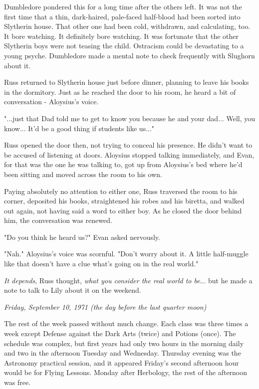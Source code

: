 \documentclass[a4paper,11pt]{article}
\begin{document}
Dumbledore pondered this for a long time after the others left. It was not the first time that a thin, dark-haired, pale-faced half-blood had been sorted into Slytherin house. That other one had been cold, withdrawn, and calculating, too. It bore watching. It definitely bore watching. It was fortunate that the other Slytherin boys were not teasing the child. Ostracism could be devastating to a young psyche. Dumbledore made a mental note to check frequently with Slughorn about it.

Russ returned to Slytherin house just before dinner, planning to leave his books in the dormitory. Just as he reached the door to his room, he heard a bit of conversation - Aloysius's voice.

"...just that Dad told me to get to know you because he and your dad... Well, you know... It'd be a good thing if students like us..."

Russ opened the door then, not trying to conceal his presence. He didn't want to be accused of listening at doors. Aloysius stopped talking immediately, and Evan, for that was the one he was talking to, got up from Aloysius's bed where he'd been sitting and moved across the room to his own.

Paying absolutely no attention to either one, Russ traversed the room to his corner, deposited his books, straightened his robes and his biretta, and walked out again, not having said a word to either boy. As he closed the door behind him, the conversation was renewed.

"Do you think he heard us?" Evan asked nervously.

"Nah." Aloysius's voice was scornful. "Don't worry about it. A little half-muggle like that doesn't have a clue what's going on in the real world."

\emph{It depends}, Russ thought, \emph{what you consider the real world to be}... but he made a note to talk to Lily about it on the weekend.

\emph{Friday, September 10, 1971 (the day before the last quarter moon)}

The rest of the week passed without much change. Each class was three times a week except Defense against the Dark Arts (twice) and Potions (once). The schedule was complex, but first years had only two hours in the morning daily and two in the afternoon Tuesday and Wednesday. Thursday evening was the Astronomy practical session, and it appeared Friday's second afternoon hour would be for Flying Lessons. Monday after Herbology, the rest of the afternoon was free.
\end{document}
